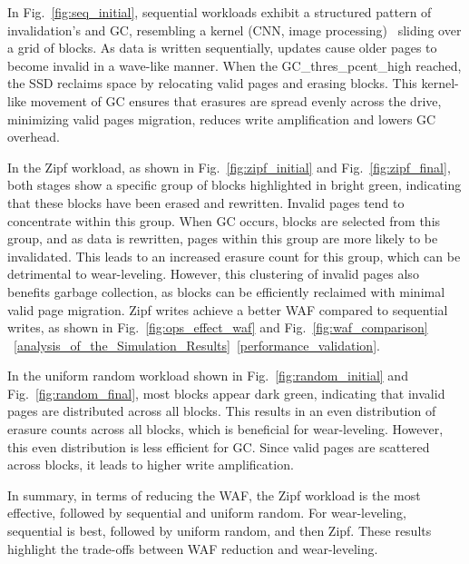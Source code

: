 \documentclass{ieeeaccess}
\begin{document}
In Fig.~\ref{fig:seq_initial}, sequential workloads exhibit a structured pattern of invalidation's and GC, resembling a kernel (CNN, image processing)~\cite{kernel} sliding over a grid of blocks. As data is written sequentially, updates cause older pages to become invalid in a wave-like manner. When the GC\_thres\_pcent\_high reached, the SSD reclaims space by relocating valid pages and erasing blocks. This kernel-like movement of GC ensures that erasures are spread evenly across the drive, minimizing valid pages migration, reduces write amplification and lowers GC overhead.

In the Zipf workload, as shown in Fig.~\ref{fig:zipf_initial} and Fig.~\ref{fig:zipf_final}, both stages show a specific group of blocks highlighted in bright green, indicating that these blocks have been erased and rewritten. Invalid pages tend to concentrate within this group. When GC occurs, blocks are selected from this group, and as data is rewritten, pages within this group are more likely to be invalidated. This leads to an increased erasure count for this group, which can be detrimental to wear-leveling. However, this clustering of invalid pages also benefits garbage collection, as blocks can be efficiently reclaimed with minimal valid page migration. Zipf writes achieve a better WAF compared to sequential writes, as shown in Fig.~\ref{fig:ops_effect_waf} and Fig.~\ref{fig:waf_comparison} ~\ref{analysis_of_the_Simulation_Results}~\ref{performance_validation}.

In the uniform random workload shown in Fig.~\ref{fig:random_initial} and Fig.~\ref{fig:random_final}, most blocks appear dark green, indicating that invalid pages are distributed across all blocks. This results in an even distribution of erasure counts across all blocks, which is beneficial for wear-leveling. However, this even distribution is less efficient for GC. Since valid pages are scattered across blocks, it leads to higher write amplification.

In summary, in terms of reducing the WAF, the Zipf workload is the most effective, followed by sequential and uniform random.
 For wear-leveling, sequential is best, followed by uniform random, and then Zipf. These results highlight the trade-offs between WAF reduction and wear-leveling.
\end{document}

